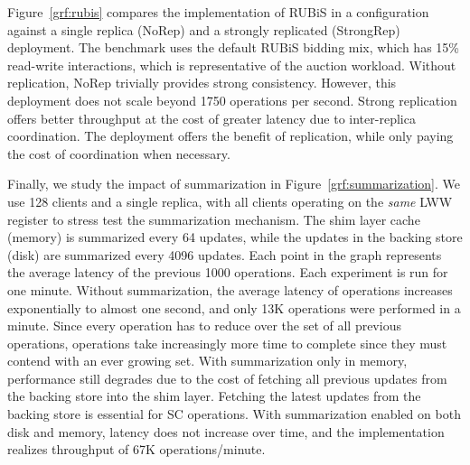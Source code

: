Figure~\ref{grf:rubis} compares the \name implementation of RUBiS in a 
configuration against a single replica (NoRep) and a strongly replicated
(StrongRep)  deployment. The benchmark uses the default RUBiS bidding
mix, which has 15\% read-write interactions, which is representative of the
auction workload.  Without replication, NoRep trivially provides strong
consistency. However, this deployment does not scale beyond 1750 operations per
second. Strong replication offers better throughput at the cost of greater
latency due to inter-replica coordination. The \name deployment offers the
benefit of replication, while only paying the cost of coordination when
necessary.

Finally, we study the impact of summarization in
Figure~\ref{grf:summarization}. We use 128 clients and a single \name replica,
with all clients operating on the \emph{same} LWW register to stress test the
summarization mechanism. The shim layer cache (memory) is summarized every 64
updates, while the updates in the backing store (disk) are summarized every
4096 updates. Each point in the graph represents the average latency of the
previous 1000 operations. Each experiment is run for one minute.  Without
summarization, the average latency of operations increases exponentially to
almost one second, and only 13K operations were performed in a minute. Since
every operation has to reduce over the set of all previous operations,
operations take increasingly more time to complete since they must contend with
an ever growing set.  With summarization only in memory, performance still
degrades due to the cost of fetching all previous updates from the backing
store into the shim layer. Fetching the latest updates from the backing store
is essential for SC operations. With summarization enabled on both disk and
memory, latency does not increase over time, and the implementation realizes
throughput of 67K operations/minute.
